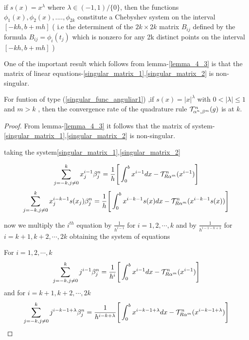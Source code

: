 \documentclass[../document.tex]{subfiles}
\begin{document}
	\begin{lemma}  \label{lemma_4_3}
		if $s(x)=x^{\lambda}$ where $\lambda \in(-1,1)/\{0\}$, then the functions
		$\phi_1(x) , \phi_2(x) , .... ,\phi_{2k}$ constitute a Chebyshev system on the interval $[-kh,b+mh]$ 
		(
		i.e the determinent of the $2k\times 2k$ matrix $B_{ij}$ defined by the formula $B_{ij} = \phi_i(t_j)$ which is nonzero for any 2k distinct points on the interval $[-kh,b+mh]$
		)
	\end{lemma}	
	
	One of the important result which follows from lemma-\ref{lemma_4_3} is that the matrix of linear equations-\ref{singular_matrix_1},\ref{singular_matrix_2}
	is non-singular.
	
	\begin{theorem}
		For funtion of type (\ref{singular_func_anguliar1}) ,if $s(x) = |x|^\lambda$ with $0<|\lambda|\leq 1$ and $m>k$ , then the convergence rate of the quadrature rule $\mathcal{T}_{\alpha^n,\beta^m}^{n} (g)$  is at $k$.
		
		\begin{proof}
			From lemma-\ref{lemma_4_3} it follows that the matrix of system-\ref{singular_matrix_1},\ref{singular_matrix_2}
			is non-singular.
			
			taking the system\ref{singular_matrix_1},\ref{singular_matrix_2}
			
			
			\begin{equation*} 
				\sum_{j=-k,j\neq0}^{k} x_j^{i-1} \beta_j^n
				= \frac{1}{h}\Bigg[ 
				\int_{0}^{b} x^{i-1}dx -\mathcal{T}_{R\alpha^m}^{n}(x^{i-1})
				\Bigg]
			\end{equation*}
			\begin{equation*} 
				\sum_{j=-k,j\neq0}^{k} 
				x_j^{i-k-1} s(x_j) \beta_j^n
				= \frac{1}{h}\Bigg[ 
				\int_{0}^{b} x^{i-k-1}s(x)dx -
				\mathcal{T}_{R\alpha^m}^{n}(x^{i-k-1}s(x))
				\Bigg]
			\end{equation*}
			
			now we  multiply the $i^{th}$ equation by $\frac{1}{h^{i-1}}$ for 
			$i=1,2,\cdots, k$ and by $\frac{1}{h^{i-1-k+\lambda}}$ for $i=k+1,k+2,\cdots,2k$ obtaining the system of equations
			
			For $i=1,2,\cdots,k$
			\begin{equation} \label{54}
				\sum_{j=-k,j\neq0}^{k} 
				j^{i-1} \beta_j^n
				= \frac{1}{h^i}\Bigg[ 
				\int_{0}^{b} x^{i-1}dx -\mathcal{T}_{R\alpha^m}^{n}(x^{i-1})
				\Bigg]
			\end{equation}
			and for $i=k+1,k+2,\cdots,2k$
			\begin{equation} \label{55}
				\sum_{j=-k,j\neq0}^{k} 
				j^{i-k-1+\lambda}  \beta_j^n
				= \frac{1}{h^{i-k+\lambda}}\Bigg[ 
				\int_{0}^{b} x^{i-k-1+\lambda}dx -
				\mathcal{T}_{R\alpha^m}^{n}(x^{i-k-1+\lambda})
				\Bigg]
			\end{equation}
			

\end{proof}
\end{theorem}
\end{document}
